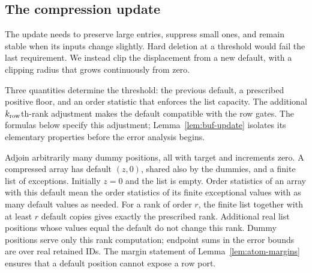 \documentclass[11pt]{article}
\numberwithin{equation}{section}
\theoremstyle{definition}
\theoremstyle{remark}
\begin{document}
\subsection{The compression update}

The update needs to preserve large entries, suppress small ones, and remain stable when its inputs change slightly. Hard deletion at a threshold would fail the last requirement. We instead clip the displacement from a new default, with a clipping radius that grows continuously from zero.

Three quantities determine the threshold: the previous default, a prescribed positive floor, and an order statistic that enforces the list capacity. The additional ${k_{\rm row}}$th-rank adjustment makes the default compatible with the row gates. The formulas below specify this adjustment; Lemma~\ref{lem:buf-update} isolates its elementary properties before the error analysis begins.

Adjoin arbitrarily many dummy positions, all with target and increments
zero.  A compressed array has default $(z,0)$, shared also by the dummies,
and a finite list of exceptions.  Initially $z=0$ and the list is empty.
Order statistics of an array with this default mean the order statistics
of its finite exceptional values with as many default values as needed.
For a rank of order $r$, the finite list together with at least $r$
default copies gives exactly the prescribed rank.  Additional real list
positions whose values equal the default do not change this rank.
Dummy positions serve only this rank computation; endpoint sums in the
error bounds are over real retained IDs.  The margin statement of
Lemma~\ref{lem:atom-margins} ensures that a default position cannot expose
a row port.
\end{document}
